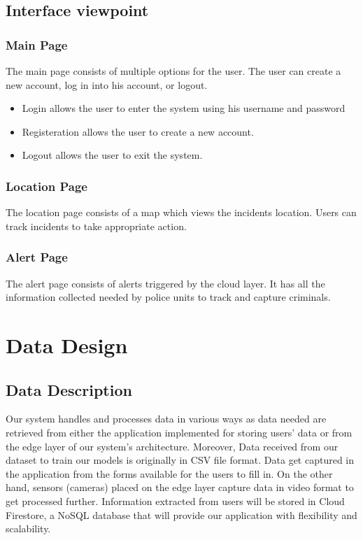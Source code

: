 \documentclass[12pt]{article}
\begin{document}
\subsection{Interface viewpoint}
\subsubsection{Main Page}
The main page consists of multiple options for the user. The user can create a new account, log in into his account, or logout.
\begin{itemize}
    \item Login allows the user to enter the system using his username and password
    \item Registeration allows the user to create a new account.
    \item Logout allows the user to exit the system.
\end{itemize}

\subsubsection{Location Page}
The location page consists of a map which views the incidents location. Users can track incidents to take appropriate action.

\subsubsection{Alert Page}
The alert page consists of alerts triggered by the cloud layer. It has all the information collected needed by police units to track and capture criminals.

\section{Data Design}
\subsection{Data Description}
Our system handles and processes data in various ways as data needed are retrieved from either the application implemented for storing users’ data or from the edge layer of our system’s architecture. Moreover, Data received from our dataset to train our models is originally in CSV file format. Data get captured in the application from the forms available for the users to fill in. On the other hand, sensors (cameras) placed on the edge layer capture data in video format to get processed further. Information extracted from users will be stored in Cloud Firestore, a NoSQL database that will provide our application with flexibility and scalability.
\end{document}
